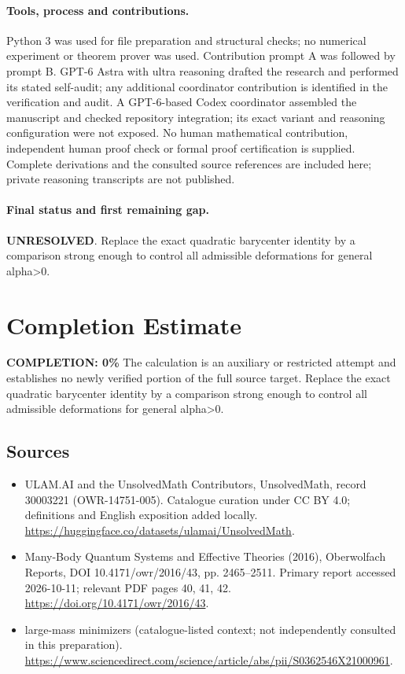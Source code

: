 \documentclass[11pt]{article}
\begin{document}
\paragraph{Tools, process and contributions.}
Python 3 was used for file preparation and structural checks; no numerical experiment or theorem prover was used. Contribution prompt A was followed by prompt B. GPT-6 Astra with ultra reasoning drafted the research and performed its stated self-audit; any additional coordinator contribution is identified in the verification and audit. A GPT-6-based Codex coordinator assembled the manuscript and checked repository integration; its exact variant and reasoning configuration were not exposed. No human mathematical contribution, independent human proof check or formal proof certification is supplied. Complete derivations and the consulted source references are included here; private reasoning transcripts are not published.

\paragraph{Final status and first remaining gap.}
\textbf{UNRESOLVED}. Replace the exact quadratic barycenter identity by a comparison strong enough to control all admissible deformations for general alpha>0.

\section{Completion Estimate}
\noindent\textbf{COMPLETION: 0\%}
The calculation is an auxiliary or restricted attempt and establishes no newly verified portion of the full source target. Replace the exact quadratic barycenter identity by a comparison strong enough to control all admissible deformations for general alpha>0.

\subsection{Sources}
\begin{itemize}
\item[\hypertarget{source:30003221:1}{S1}] ULAM.AI and the UnsolvedMath Contributors, UnsolvedMath, record 30003221 (OWR-14751-005). Catalogue curation under CC BY 4.0; definitions and English exposition added locally.
\url{https://huggingface.co/datasets/ulamai/UnsolvedMath}.
\item[\hypertarget{source:30003221:2}{S2}] Many-Body Quantum Systems and Effective Theories (2016), Oberwolfach Reports, DOI 10.4171/owr/2016/43, pp. 2465--2511. Primary report accessed 2026-10-11; relevant PDF pages 40, 41, 42.
\url{https://doi.org/10.4171/owr/2016/43}.
\item[\hypertarget{source:30003221:3}{S3}] large-mass minimizers (catalogue-listed context; not independently consulted in this preparation).
\url{https://www.sciencedirect.com/science/article/abs/pii/S0362546X21000961}.
\end{itemize}
\label{end:30003221}
\end{document}
